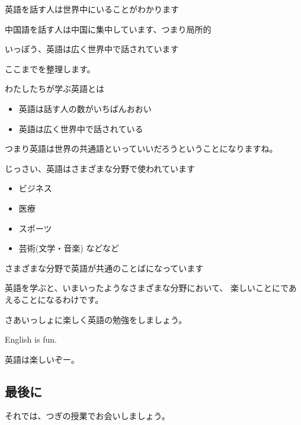 \documentclass[12pt]{jlreq}
\begin{document}
英語を話す人は世界中にいることがわかります

\hrulefill

中国語を話す人は中国に集中しています、つまり局所的

いっぽう、英語は広く世界中で話されています

\hrulefill

ここまでを整理します。

わたしたちが学ぶ英語とは

\begin{itemize}
 \item 英語は話す人の数がいちばんおおい

 \item 英語は広く世界中で話されている
\end{itemize}

 

つまり英語は世界の共通語といっていいだろうということになりますね。



\hrulefill

じっさい、英語はさまざまな分野で使われています

\begin{itemize}
 \item ビジネス
 \item 医療
 \item スポーツ
 \item 芸術(文学・音楽) などなど
\end{itemize}
さまざまな分野で英語が共通のことばになっています


\hrulefill

英語を学ぶと、いまいったようなさまざまな分野において、
楽しいことにであえることになるわけです。

さあいっしょに楽しく英語の勉強をしましょう。

\hrulefill

English is fun.

英語は楽しいぞー。



\subsection*{最後に}

それでは、つぎの授業でお会いしましょう。


\hrulefill
\hrulefill
\hrulefill
\hrulefill
\end{document}
